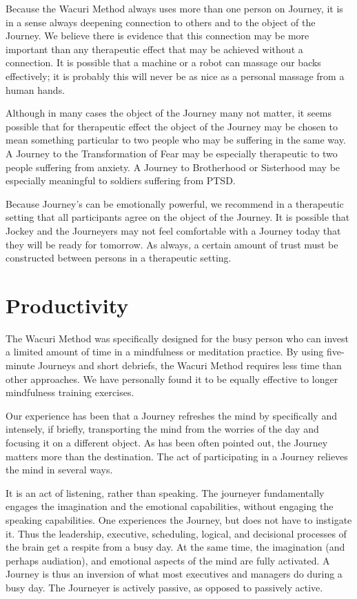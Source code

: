 \documentclass[12pt]{book}
\begin{document}
Because the Wacuri Method always uses more than one person on Journey,
it is in a sense always deepening connection to others and to the
object of the Journey. We believe there is evidence that this
connection may be more important than any therapeutic effect that may
be achieved without a connection. It is possible that a machine or a
robot can massage our backs effectively; it is probably this will
never be as nice as a personal massage from a human hands.

Although in many cases the object of the Journey many not matter, it
seems possible that for therapeutic effect the object of the Journey
may be chosen to mean something particular to two people who may be
suffering in the same way. A Journey to the Transformation of Fear may
be especially therapeutic to two people suffering from anxiety. A
Journey to Brotherhood or Sisterhood may be especially meaningful to
soldiers suffering from PTSD.

Because Journey's can be emotionally powerful, we recommend in a
therapeutic setting that all participants agree on the object of the
Journey. It is possible that Jockey and the Journeyers may not feel
comfortable with a Journey today that they will be ready for
tomorrow. As always, a certain amount of trust must be constructed
between persons in a therapeutic setting.

\section{Productivity}

The Wacuri Method was specifically designed for the busy person who
can invest a limited amount of time in a mindfulness or meditation
practice. By using five-minute Journeys and short debriefs, the Wacuri
Method requires less time than other approaches. We have personally
found it to be equally effective to longer mindfulness training
exercises.

Our experience has been that a Journey refreshes the mind by
specifically and intensely, if briefly, transporting the mind from the
worries of the day and focusing it on a different object. As has been
often pointed out, the Journey matters more than the destination. The
act of participating in a Journey relieves the mind in several ways.

It is an act of listening, rather than speaking. The journeyer
fundamentally engages the imagination and the emotional capabilities,
without engaging the speaking capabilities. One experiences the
Journey, but does not have to instigate it.  Thus the leadership,
executive, scheduling, logical, and decisional processes of the brain get a respite
from a busy day. At the same time, the imagination (and perhaps
audiation), and emotional aspects of the mind are fully activated. A
Journey is thus an inversion of what most executives and managers do
during a busy day. The Journeyer is actively passive, as opposed to passively active.
\end{document}

